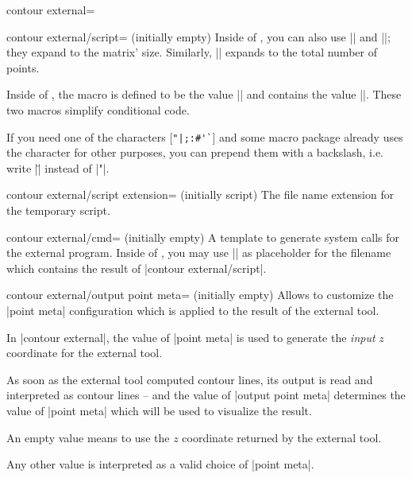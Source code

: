 {{\begin{plottype}[/pgfplots]{contour external=\textcolor{black}{}}
\begin{pgfplotskey}{contour external/script= (initially empty)}
		Inside of , you can also use || and ||; they expand to the matrix' size. Similarly, || expands to the total number of points.

		Inside of , the macro \declareandlabel{\thecontournumber} is defined to be the value || and \declareandlabel{\thecontourlevels} contains the value ||. These two macros simplify conditional code.

		If you need one of the characters [\verb!"|;:#'`!] and some macro package already uses the character for other purposes, you can prepend them with a backslash, i.e. write |\"| instead of |"|.
	\end{pgfplotskey}

	\begin{pgfplotskey}{contour external/script extension= (initially script)}
		The file name extension for the temporary script.
	\end{pgfplotskey}

	\begin{pgfplotskey}{contour external/cmd= (initially empty)}
		A template to generate system calls for the external program. Inside of , you may use |\script| as placeholder for the filename which contains the result of |contour external/script|.
	\end{pgfplotskey}

	\begin{pgfplotskey}{contour external/output point meta= (initially empty)}
		Allows to customize the |point meta| configuration which is applied to the result of the external tool.

		In |contour external|, the value of |point meta| is used to generate the \emph{input} $z$ coordinate for the external tool.

		As soon as the external tool computed contour lines, its output is read and interpreted as contour lines -- and the value of |output point meta| determines the value of |point meta| which will be used to visualize the result. 

		An empty value means to use the $z$ coordinate returned by the external tool.

		Any other value is interpreted as a valid choice of |point meta|.
	\end{pgfplotskey}


\end{plottype}}}
